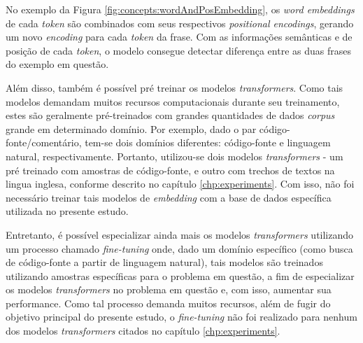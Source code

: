 No exemplo da Figura \ref{fig:concepts:wordAndPosEmbedding}, os \textit{word embeddings} de cada \textit{token} são combinados com seus respectivos \textit{positional encodings}, gerando um novo \textit{encoding} para cada \textit{token} da frase. Com as informações semânticas e de posição de cada \textit{token}, o modelo consegue detectar diferença entre as duas frases do exemplo em questão.


Além disso, também é possível pré treinar os modelos \textit{transformers}. Como tais modelos demandam muitos recursos computacionais durante seu treinamento, estes são geralmente pré-treinados com grandes quantidades de dados \textit{corpus} grande em determinado domínio. Por exemplo, dado o par código-fonte/comentário, tem-se dois domínios diferentes: código-fonte e linguagem natural, respectivamente. Portanto, utilizou-se dois modelos \textit{transformers} - um pré treinado com amostras de código-fonte, e outro com trechos de textos na lingua inglesa, conforme descrito no capítulo \ref{chp:experiments}. Com isso, não foi necessário treinar tais modelos de \textit{embedding} com a base de dados específica utilizada no presente estudo. 

Entretanto, é possível especializar ainda mais os modelos \textit{transformers} utilizando um processo chamado \textit{fine-tuning} onde, dado um domínio específico (como busca de código-fonte a partir de linguagem natural), tais modelos são treinados utilizando amostras específicas para o problema em questão, a fim de especializar os modelos \textit{transformers} no problema em questão e, com isso, aumentar sua performance. Como tal processo demanda muitos recursos, além de fugir do objetivo principal do presente estudo, o \textit{fine-tuning} não foi realizado para nenhum dos modelos \textit{transformers} citados no capítulo \ref{chp:experiments}.

